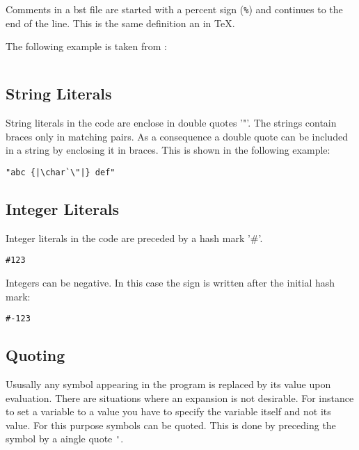 Comments in a bst file are started with a percent sign (\verb|%|) and
continues to the end of the line. This is the same definition an in
\TeX{}.

The following example is taken from :

\begin{lstlisting}[language=bst]
  % BibTeX standard bibliography style `alpha'
\end{lstlisting}


\subsection{String Literals}\label{sec:bst.strings}

String literals in the code are enclose in double quotes '"'. The
strings contain braces only in matching pairs. As a consequence a
double quote can be included in a string by enclosing it in braces.
This is shown in the following example:

\begin{lstlisting}[language=bst,escapechar=|]
  "abc {|\char`\"|} def"
\end{lstlisting}


\subsection{Integer Literals}\label{sec:bst.integers}

Integer literals in the code are preceded by a hash mark '\#'.

\begin{lstlisting}[language=bst]
  #123
\end{lstlisting}

Integers can be negative. In this case the sign is written after the
initial hash mark:

\begin{lstlisting}[language=bst]
  #-123
\end{lstlisting}


\subsection{Quoting}\label{sec:bst.quote}

Ususally any symbol appearing in the program is replaced by its value
upon evaluation. There are situations where an expansion is not
desirable. For instance to set a variable to a value you have to
specify the variable itself and not its value. For this purpose
symbols can be quoted. This is done by preceding the symbol by a
aingle quote \verb|'|.

